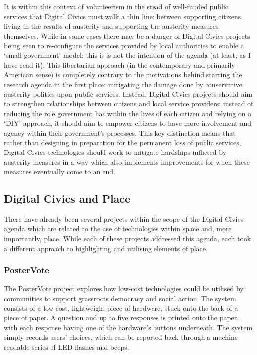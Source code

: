 It is within this context of volunteerism in the stead of well-funded public services that Digital Civics must walk a thin line: between supporting citizens living in the results of austerity and supporting the austerity measures themselves. While in some cases there may be a danger of Digital Civics projects being seen to re-configure the services provided by local authorities to enable a `small government' model, this is is not the intention of the agenda (at least, as I have read it). This libertarian approach (in the contemporary and primarily American sense) is completely contrary to the motivations behind starting the research agenda in the first place: mitigating the damage done by conservative austerity politics upon public services. Instead, Digital Civics projects should aim to strengthen relationships between citizens and local service providers: instead of reducing the role government has within the lives of each citizen and relying on a `DIY' approach, it should aim to empower citizens to have more involvement and agency within their government's processes. This key distinction means that rather than designing in preparation for the permanent loss of public services, Digital Civics technologies should work to mitigate hardships inflicted by austerity measures in a way which also implements improvements for when these measures eventually come to an end. 

\subsection{Digital Civics and Place}

There have already been several projects within the scope of the Digital Civics agenda which are related to the use of technologies within space and, more importantly, place. While each of these projects addressed this agenda, each took a different approach to highlighting and utilising elements of place.

\subsubsection{PosterVote}
The PosterVote project \citep{Vlachokyriakos2014} explores how low-cost technologies could be utilised by communities to support grassroots democracy and social action. The system consists of a low cost, lightweight piece of hardware, stuck onto the back of a piece of paper. A question and up to five responses is printed onto the paper, with each response having one of the hardware's buttons underneath. The system simply records users' choices, which can be reported back through a machine-readable series of LED flashes and beeps. 

